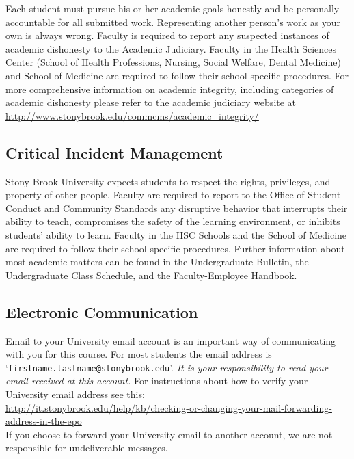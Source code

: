 \documentclass[10pt]{article}
\begin{document}
Each student must pursue his or her academic goals honestly and be
personally accountable for all submitted work. Representing another
person's work as your own is always wrong. Faculty is required to
report any suspected instances of academic dishonesty to the Academic
Judiciary. Faculty in the Health Sciences Center (School of Health
Professions, Nursing, Social Welfare, Dental Medicine) and School of
Medicine are required to follow their school-specific procedures. For
more comprehensive information on academic integrity, including
categories of academic dishonesty please refer to the academic
judiciary website at\\
{\small \url{http://www.stonybrook.edu/commcms/academic\_integrity/}}


\subsection*{Critical Incident Management}

Stony Brook University expects students to respect the rights,
privileges, and property of other people. Faculty are required to
report to the Office of Student Conduct and Community Standards any
disruptive behavior that interrupts their ability to teach,
compromises the safety of the learning environment, or inhibits
students' ability to learn. Faculty in the HSC Schools and the School
of Medicine are required to follow their school-specific
procedures. Further information about most academic matters can be
found in the Undergraduate Bulletin, the Undergraduate Class Schedule,
and the Faculty-Employee Handbook.


\subsection*{Electronic Communication}

Email to your University email account is an important way
of communicating with you for this course.  For most students the
email address is `{\tt firstname.lastname@stonybrook.edu}'.
{\em It is your responsibility to read your email received at this
  account.}  For instructions about how to verify your University
email address see this: \\
{\small \url{http://it.stonybrook.edu/help/kb/checking-or-changing-your-mail-forwarding-address-in-the-epo}}\\
If you choose to forward your University email to another account, we
are not responsible for undeliverable messages.
\end{document}
